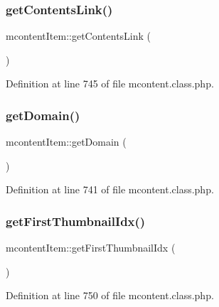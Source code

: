 \subsubsection{\texorpdfstring{get\+Contents\+Link()}{getContentsLink()}}
{\footnotesize\ttfamily mcontent\+Item\+::get\+Contents\+Link (\begin{DoxyParamCaption}{ }\end{DoxyParamCaption})}



Definition at line 745 of file mcontent.\+class.\+php.

\mbox{\label{classmcontentItem_a29a4fb4f4bedd748ec93238be37a22fb}} 
\subsubsection{\texorpdfstring{get\+Domain()}{getDomain()}}
{\footnotesize\ttfamily mcontent\+Item\+::get\+Domain (\begin{DoxyParamCaption}{ }\end{DoxyParamCaption})}



Definition at line 741 of file mcontent.\+class.\+php.

\mbox{\label{classmcontentItem_acb7e5ab4fbeac716585618eba64960aa}} 
\subsubsection{\texorpdfstring{get\+First\+Thumbnail\+Idx()}{getFirstThumbnailIdx()}}
{\footnotesize\ttfamily mcontent\+Item\+::get\+First\+Thumbnail\+Idx (\begin{DoxyParamCaption}{ }\end{DoxyParamCaption})}



Definition at line 750 of file mcontent.\+class.\+php.

\mbox{\label{classmcontentItem_a5a2cad58644aabb016942e427998f32c}} 
